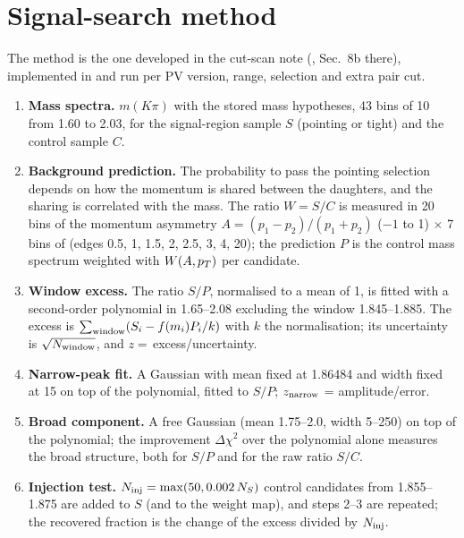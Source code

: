 \section{Signal-search method}
\label{sec:method}
The method is the one developed in the \Dzero{} cut-scan note (, Sec.~8b there), implemented in
 and run per PV version, \pt{} range, selection and extra pair cut.

\begin{enumerate}
\item \textbf{Mass spectra.} $m(K\pi)$ with the stored mass hypotheses, 43 bins of 10\mev{} from 1.60 to
  2.03\gevcc, for the signal-region sample $S$ (pointing or tight) and the control sample $C$.
\item \textbf{Background prediction.} The probability to pass the pointing selection depends on how the momentum is
  shared between the daughters, and the sharing is correlated with the mass. The ratio $W=S/C$ is measured in
  20 bins of the momentum asymmetry $A=(p_1-p_2)/(p_1+p_2)$ ($-1$ to 1) $\times$ 7 bins of \Dzero{} \pt{} (edges 0.5, 1,
  1.5, 2, 2.5, 3, 4, 20\gevc); the prediction $P$ is the control mass spectrum weighted with $W(A,p_T)$ per candidate.
\item \textbf{Window excess.} The ratio $S/P$, normalised to a mean of 1, is fitted with a second-order polynomial in
  1.65--2.08\gevcc{} excluding the window 1.845--1.885\gevcc. The excess is
  $\sum_{\rm window}(S_i-f(m_i)P_i/k)$ with $k$ the normalisation; its uncertainty is $\sqrt{N_{\rm window}}$, and
  $z=$\,excess/uncertainty.
\item \textbf{Narrow-peak fit.} A Gaussian with mean fixed at 1.86484\gevcc{} and width fixed at 15\mev{} on top of the
  polynomial, fitted to $S/P$; $z_{\rm narrow}$ = amplitude/error.
\item \textbf{Broad component.} A free Gaussian (mean 1.75--2.0\gevcc, width 5--250\mev) on top of the polynomial; the
  improvement $\Delta\chi^2$ over the polynomial alone measures the broad structure, both for $S/P$ and for the raw
  ratio $S/C$.
\item \textbf{Injection test.} $N_{\rm inj}=\max(50, 0.002\,N_S)$ control candidates from 1.855--1.875\gevcc{} are
  added to $S$ (and to the weight map), and steps 2--3 are repeated; the recovered fraction is the change of the excess
  divided by $N_{\rm inj}$.
\end{enumerate}

